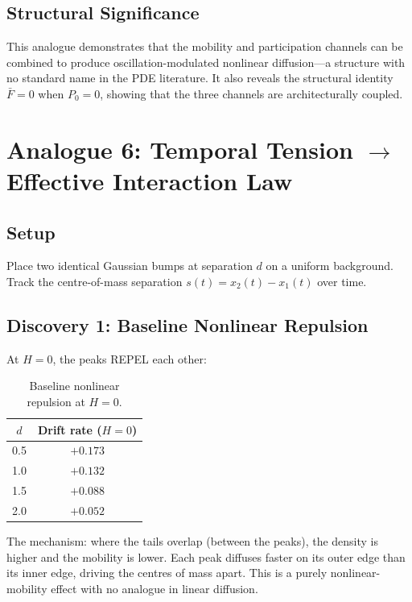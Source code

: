 \documentclass[11pt]{article}
\begin{document}
\subsection{Structural Significance}

This analogue demonstrates that the mobility and participation channels can be combined to produce oscillation-modulated nonlinear diffusion---a structure with no standard name in the PDE literature. It also reveals the structural identity \(\bar{F} = 0\) when \(P_0 = 0\), showing that the three channels are architecturally coupled.

\section{Analogue 6: Temporal Tension \texorpdfstring{$\to$}{->} Effective Interaction Law}

\subsection{Setup}

Place two identical Gaussian bumps at separation \(d\) on a uniform background. Track the centre-of-mass separation \(s(t) = x_2(t) - x_1(t)\) over time.

\subsection{Discovery 1: Baseline Nonlinear Repulsion}

At \(H = 0\), the peaks REPEL each other:

\begin{table}[h]
\centering
\begin{tabular}{@{}cc@{}}
\toprule
\(d\) & Drift rate (\(H=0\)) \\
\midrule
0.5 & \(+0.173\) \\
1.0 & \(+0.132\) \\
1.5 & \(+0.088\) \\
2.0 & \(+0.052\) \\
\bottomrule
\end{tabular}
\caption{Baseline nonlinear repulsion at \(H=0\).}
\label{tab:repulsion}
\end{table}

The mechanism: where the tails overlap (between the peaks), the density is higher and the mobility is lower. Each peak diffuses faster on its outer edge than its inner edge, driving the centres of mass apart. This is a purely nonlinear-mobility effect with no analogue in linear diffusion.
\end{document}
